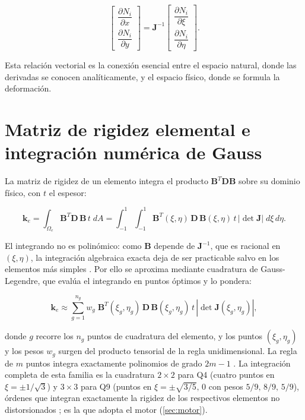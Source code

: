\begin{equation}
\begin{bmatrix}
\dfrac{\partial N_i}{\partial x} \\[6pt]
\dfrac{\partial N_i}{\partial y}
\end{bmatrix}
= \bm{J}^{-1}
\begin{bmatrix}
\dfrac{\partial N_i}{\partial \xi} \\[6pt]
\dfrac{\partial N_i}{\partial \eta}
\end{bmatrix}.
\label{eq:fisica-natural}
\end{equation}

Esta relación vectorial es la conexión esencial entre el espacio natural, donde las derivadas se conocen analíticamente, y el espacio físico, donde se formula la deformación.

\section{Matriz de rigidez elemental e integración numérica de Gauss}
\label{sec:rigidez-gauss}

La matriz de rigidez de un elemento integra el producto $\bm{B}^T\bm{D}\bm{B}$ sobre su dominio físico, con $t$ el espesor:

\begin{equation}
\bm{k}_e = \int_{\Omega_e} \bm{B}^T \bm{D}\, \bm{B}\, t \; dA
= \int_{-1}^{1}\!\!\int_{-1}^{1} \bm{B}^T(\xi,\eta)\,\bm{D}\,\bm{B}(\xi,\eta)\, t\, |\det\bm{J}|\; d\xi\, d\eta.
\label{eq:ke-integral}
\end{equation}

El integrando no es polinómico: como $\bm{B}$ depende de $\bm{J}^{-1}$, que es racional en $(\xi,\eta)$, la integración algebraica exacta deja de ser practicable salvo en los elementos más simples \autocites[p.~147]{zienkiewicz2013fem}[p.~191]{hughes2000fem}. Por ello se aproxima mediante cuadratura de Gauss-Legendre, que evalúa el integrando en puntos óptimos y lo pondera:

\begin{equation}
\bm{k}_e \approx \sum_{g=1}^{n_g} w_g\; \bm{B}^T(\xi_g,\eta_g)\,\bm{D}\,\bm{B}(\xi_g,\eta_g)\, t\, |\det\bm{J}(\xi_g,\eta_g)|,
\label{eq:ke-gauss}
\end{equation}

donde $g$ recorre los $n_g$ puntos de cuadratura del elemento, y los puntos $(\xi_g,\eta_g)$ y los pesos $w_g$ surgen del producto tensorial de la regla unidimensional. La regla de $m$ puntos integra exactamente polinomios de grado $2m-1$ \autocites[pp.~141-142]{hughes2000fem}[p.~161]{zienkiewicz2013fem}. La integración completa de esta familia es la cuadratura $2\times2$ para Q4 (cuatro puntos en $\xi = \pm 1/\sqrt{3}$) y $3\times3$ para Q9 (puntos en $\xi = \pm\sqrt{3/5},\,0$ con pesos $5/9,\,8/9,\,5/9$), órdenes que integran exactamente la rigidez de los respectivos elementos no distorsionados \autocites[pp.~221-222]{hughes2000fem}[p.~470]{bathe2014fem}; es la que adopta el motor (\autoref{sec:motor}).

